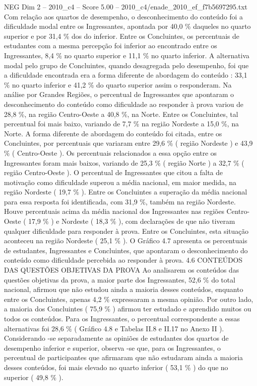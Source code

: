 \begin{textsample}{NEG Dim 2 – 2010\_c4 – Score 5.00 – 2010\_c4/enade\_2010\_ef\_f7b5697295.txt}
Com relação aos quartos de desempenho, o desconhecimento do conteúdo foi a dificuldade modal entre os Ingressantes, apontada por 40,0 \% daqueles no quarto superior e por 31,4 \% dos do inferior.
Entre os Concluintes, os percentuais de estudantes com a mesma percepção foi inferior ao encontrado entre os Ingressantes, 8,4 \% no quarto superior e 11,1 \% no quarto inferior.
A alternativa modal pelo grupo de Concluintes, quando desagregada pelo desempenho, foi que a dificuldade encontrada era a forma diferente de abordagem do conteúdo : 33,1 \% no quarto inferior e 41,2 \% do quarto superior assim o responderam.
Na análise por Grandes Regiões, o percentual de Ingressantes que apontaram o desconhecimento do conteúdo como dificuldade ao responder à prova variou de 28,8 \%, na região Centro-Oeste a 40,8 \%, na Norte.
Entre os Concluintes, tal percentual foi mais baixo, variando de 7,7 \% na região Nordeste a 15,0 \%, na Norte.
A forma diferente de abordagem do conteúdo foi citada, entre os Concluintes, por percentuais que variaram entre 29,6 \% ( região Nordeste ) e 43,9 \% ( Centro-Oeste ).
Os percentuais relacionados a essa opção entre os Ingressantes foram mais baixos, variando de 25,3 \% ( região Norte ) a 32,7 \% ( região Centro-Oeste ).
O percentual de Ingressantes que citou a falta de motivação como dificuldade superou a média nacional, em maior medida, na região Nordeste ( 19,7 \% ).
Entre os Concluintes a superação da média nacional para essa resposta foi identificada, com 31,9 \%, também na região Nordeste.
Houve percentuais acima da média nacional dos Ingressantes nas regiões Centro-Oeste ( 17,9 \% ) e Nordeste ( 18,3 \% ), com declarações de que não tiveram qualquer dificuldade para responder à prova.
Entre os Concluintes, esta situação aconteceu na região Nordeste ( 25,1 \% ).
O Gráfico 4.7 apresenta os percentuais de estudantes, Ingressantes e Concluintes, que apontaram o desconhecimento do conteúdo como dificuldade percebida ao responder à prova. 4.6 CONTEÚDOS DAS QUESTÕES OBJETIVAS DA PROVA Ao analisarem os conteúdos das questões objetivas da prova, a maior parte dos Ingressantes, 52,6 \% do total nacional, afirmou que não estudou ainda a maioria desses conteúdos, enquanto entre os Concluintes, apenas 4,2 \% expressaram a mesma opinião.
Por outro lado, a maioria dos Concluintes ( 75,9 \% ) afirmou ter estudado e aprendido muitos ou todos os conteúdos.
Para os Ingressantes, o percentual correspondente a essas alternativas foi 28,6 \% ( Gráfico 4.8 e Tabelas II.8 e II.17 no Anexo II ).
Considerando -se separadamente as opiniões de estudantes dos quartos de desempenho inferior e superior, observa -se que, para os Ingressantes, o percentual de participantes que afirmaram que não estudaram ainda a maioria desses conteúdos, foi mais elevado no quarto inferior ( 53,1 \% ) do que no superior ( 49,8 \% ).

\end{textsample}
